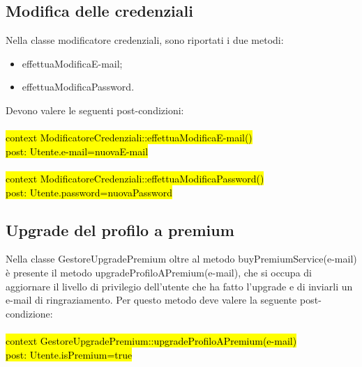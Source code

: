 \subsection{Modifica delle credenziali}
Nella classe modificatore credenziali, sono riportati i due metodi:
\begin{itemize}
    \item effettuaModificaE-mail;
    \item effettuaModificaPassword. 
\end{itemize}
Devono valere le seguenti post-condizioni: \\
\\
\hl{context ModificatoreCredenziali::effettuaModificaE-mail() \\
post: Utente.e-mail=nuovaE-mail \\}
\\
\hl{context ModificatoreCredenziali::effettuaModificaPassword() \\
post: Utente.password=nuovaPassword}

\subsection{Upgrade del profilo a premium}
Nella classe GestoreUpgradePremium oltre al metodo buyPremiumService(e-mail) è presente il metodo upgradeProfiloAPremium(e-mail), che si occupa di aggiornare il livello di privilegio dell'utente che ha fatto l'upgrade e di inviarli un e-mail di ringraziamento. Per questo metodo deve valere la seguente post-condizione: \\
\\
\hl{context GestoreUpgradePremium::upgradeProfiloAPremium(e-mail) \\
post: Utente.isPremium=true}

